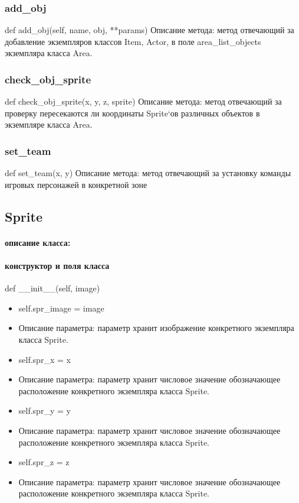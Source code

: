 \subsubsection{add\_obj}
def add\_obj(self, name, obj, **params)
Описание метода: метод отвечающий за добавление экземпляров классов Item, Actor, в поле area\_list\_objects экземпляра класса Area.
\subsubsection{check\_obj\_sprite}
def check\_obj\_sprite(x, y, z, sprite)
Описание метода: метод отвечающий за проверку пересекаются ли координаты Sprite`ов различных объектов в экземпляре класса Area.
\subsubsection{set\_team}
def set\_team(x, y)
Описание метода: метод отвечающий за установку команды игровых персонажей в конкретной зоне

\subsection{Sprite}
\paragraph{описание класса:}
\paragraph{конструктор и поля класса}
def \_\_init\_\_(self, image)
\begin{itemize}
	\item self.spr\_image = image
	\item Описание параметра: параметр хранит изображение конкретного экземпляра класса Sprite.
	\item self.spr\_x = x
	\item Описание параметра: параметр хранит числовое значение обозначающее расположение конкретного экземпляра класса Sprite.
	\item self.spr\_y = y
	\item Описание параметра: параметр хранит числовое значение обозначающее расположение конкретного экземпляра класса Sprite.
	\item self.spr\_z = z
	\item Описание параметра: параметр хранит числовое значение обозначающее расположение конкретного экземпляра класса Sprite.
\end{itemize}

